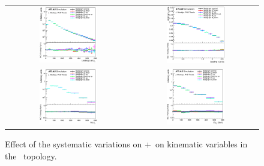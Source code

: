 \begin{figure}[p]
\begin{center}
\begin{tabular}{cc}
\includegraphics[width=0.48\textwidth]{Modeling/Figures/mgcc_tt1gccq_q1_pt_norm.eps} &
\includegraphics[width=0.48\textwidth]{Modeling/Figures/mgcc_tt1gccq_q1_eta_norm.eps} \\
\includegraphics[width=0.48\textwidth]{Modeling/Figures/mgcc_tt1gccq_top_pt_norm.eps} &
\includegraphics[width=0.48\textwidth]{Modeling/Figures/mgcc_tt1gccq_ttbar_pt_norm.eps} \\
\end{tabular}
\caption{Effect of the systematic variations on \madgraph+\pythia\ on kinematic variables in the \ttC\ topology.}
\label{fig:mgcc_tt1gcc}
\end{center}
\end{figure}
